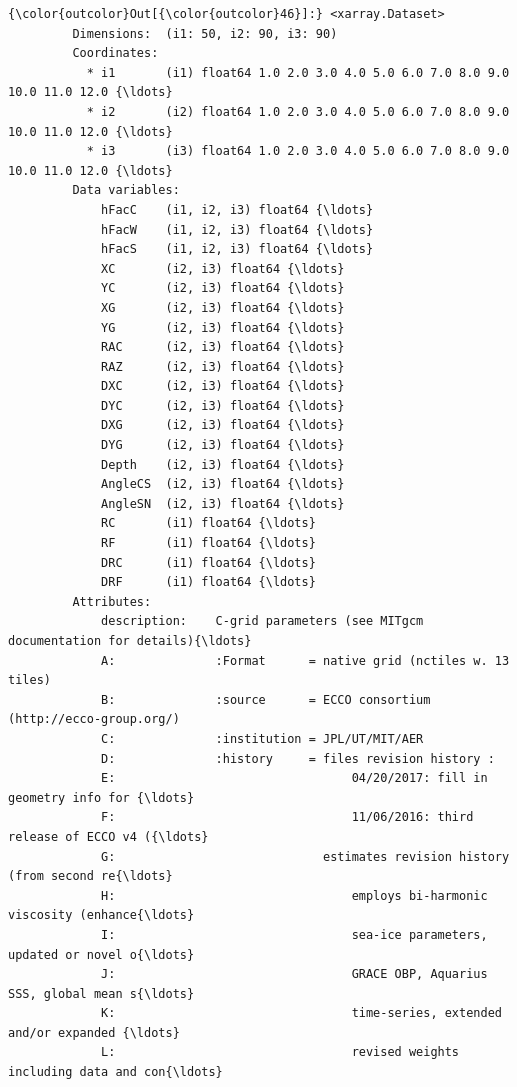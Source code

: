 \documentclass[11pt]{article}
\begin{document}
\begin{Verbatim}[commandchars=\\\{\}]
{\color{outcolor}Out[{\color{outcolor}46}]:} <xarray.Dataset>
         Dimensions:  (i1: 50, i2: 90, i3: 90)
         Coordinates:
           * i1       (i1) float64 1.0 2.0 3.0 4.0 5.0 6.0 7.0 8.0 9.0 10.0 11.0 12.0 {\ldots}
           * i2       (i2) float64 1.0 2.0 3.0 4.0 5.0 6.0 7.0 8.0 9.0 10.0 11.0 12.0 {\ldots}
           * i3       (i3) float64 1.0 2.0 3.0 4.0 5.0 6.0 7.0 8.0 9.0 10.0 11.0 12.0 {\ldots}
         Data variables:
             hFacC    (i1, i2, i3) float64 {\ldots}
             hFacW    (i1, i2, i3) float64 {\ldots}
             hFacS    (i1, i2, i3) float64 {\ldots}
             XC       (i2, i3) float64 {\ldots}
             YC       (i2, i3) float64 {\ldots}
             XG       (i2, i3) float64 {\ldots}
             YG       (i2, i3) float64 {\ldots}
             RAC      (i2, i3) float64 {\ldots}
             RAZ      (i2, i3) float64 {\ldots}
             DXC      (i2, i3) float64 {\ldots}
             DYC      (i2, i3) float64 {\ldots}
             DXG      (i2, i3) float64 {\ldots}
             DYG      (i2, i3) float64 {\ldots}
             Depth    (i2, i3) float64 {\ldots}
             AngleCS  (i2, i3) float64 {\ldots}
             AngleSN  (i2, i3) float64 {\ldots}
             RC       (i1) float64 {\ldots}
             RF       (i1) float64 {\ldots}
             DRC      (i1) float64 {\ldots}
             DRF      (i1) float64 {\ldots}
         Attributes:
             description:    C-grid parameters (see MITgcm documentation for details){\ldots}
             A:              :Format      = native grid (nctiles w. 13 tiles)
             B:              :source      = ECCO consortium (http://ecco-group.org/)
             C:              :institution = JPL/UT/MIT/AER
             D:              :history     = files revision history :
             E:                                 04/20/2017: fill in geometry info for {\ldots}
             F:                                 11/06/2016: third release of ECCO v4 ({\ldots}
             G:                             estimates revision history (from second re{\ldots}
             H:                                 employs bi-harmonic viscosity (enhance{\ldots}
             I:                                 sea-ice parameters, updated or novel o{\ldots}
             J:                                 GRACE OBP, Aquarius SSS, global mean s{\ldots}
             K:                                 time-series, extended and/or expanded {\ldots}
             L:                                 revised weights including data and con{\ldots}

\end{Verbatim}
\end{document}
